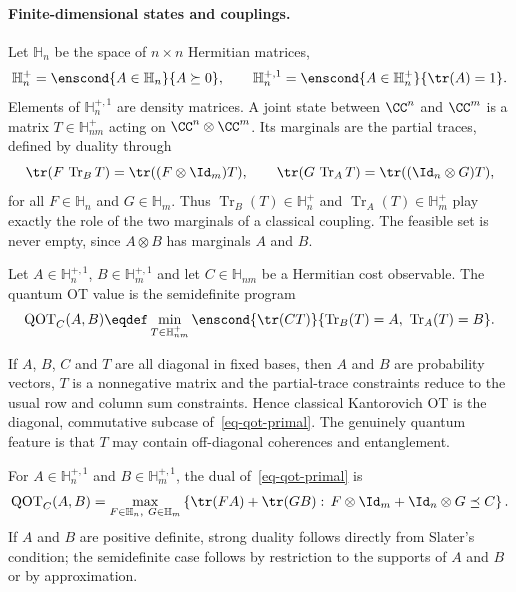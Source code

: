 \paragraph{Finite-dimensional states and couplings.}

Let $\mathbb H_n$ be the space of $n\times n$ Hermitian matrices,
\[
	\mathbb H_n^+
	=
	\enscond{A\in\mathbb H_n}{A\succeq0},
	\qquad
	\mathbb H_n^{+,1}
	=
	\enscond{A\in\mathbb H_n^+}{\tr(A)=1}.
\]
Elements of $\mathbb H_n^{+,1}$ are density matrices. A joint state between $\CC^n$ and $\CC^m$ is a matrix $T\in\mathbb H_{nm}^+$ acting on $\CC^n\otimes\CC^m$. Its marginals are the partial traces, defined by duality through
\begin{equation}\label{eq-qot-partial-traces}
	\tr(F\,\operatorname{Tr}_B T)=\tr((F\otimes\Id_m)T),
	\qquad
	\tr(G\,\operatorname{Tr}_A T)=\tr((\Id_n\otimes G)T),
\end{equation}
for all $F\in\mathbb H_n$ and $G\in\mathbb H_m$. Thus $\operatorname{Tr}_B(T)\in\mathbb H_n^+$ and $\operatorname{Tr}_A(T)\in\mathbb H_m^+$ play exactly the role of the two marginals of a classical coupling. The feasible set is never empty, since $A\otimes B$ has marginals $A$ and $B$.

\begin{defn}\label{def-finite-dimensional-qot}
	Let $A\in\mathbb H_n^{+,1}$, $B\in\mathbb H_m^{+,1}$ and let $C\in\mathbb H_{nm}$ be a Hermitian cost observable. The quantum OT value is the semidefinite program
	\begin{equation}\label{eq-qot-primal}
		\mathrm{QOT}_C(A,B)
		\eqdef
		\min_{T\in\mathbb H_{nm}^+}
		\enscond{\tr(CT)}{\operatorname{Tr}_B(T)=A,\ \operatorname{Tr}_A(T)=B}.
	\end{equation}
\end{defn}

\begin{rem}\label{rem-qot-classical-diagonal-case}
	If $A$, $B$, $C$ and $T$ are all diagonal in fixed bases, then $A$ and $B$ are probability vectors, $T$ is a nonnegative matrix and the partial-trace constraints reduce to the usual row and column sum constraints. Hence classical Kantorovich OT is the diagonal, commutative subcase of~\eqref{eq-qot-primal}. The genuinely quantum feature is that $T$ may contain off-diagonal coherences and entanglement.
\end{rem}


\begin{prop}\label{prop-qot-duality}
	For $A\in\mathbb H_n^{+,1}$ and $B\in\mathbb H_m^{+,1}$, the dual of~\eqref{eq-qot-primal} is
	\begin{equation}\label{eq-qot-dual}
		\mathrm{QOT}_C(A,B)
		=
		\max_{F\in\mathbb H_n,\ G\in\mathbb H_m}
		\left\{
			\tr(FA)+\tr(GB)
			:\,
			F\otimes\Id_m+\Id_n\otimes G\preceq C
		\right\}.
	\end{equation}
	If $A$ and $B$ are positive definite, strong duality follows directly from Slater's condition; the semidefinite case follows by restriction to the supports of $A$ and $B$ or by approximation.
\end{prop}

